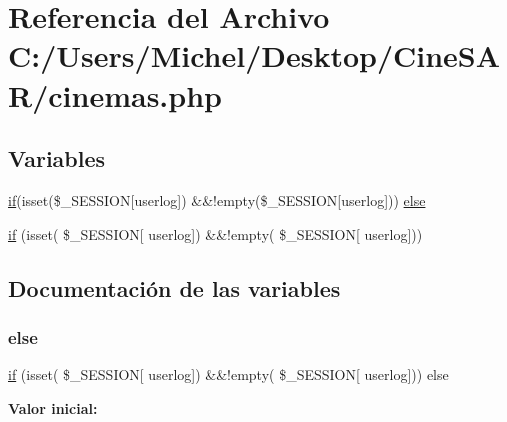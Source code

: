 \hypertarget{cinemas_8php}{}\section{Referencia del Archivo C\+:/\+Users/\+Michel/\+Desktop/\+Cine\+S\+A\+R/cinemas.php}
\label{cinemas_8php}
\subsection*{Variables}
\begin{DoxyCompactItemize}
\item 
\mbox{\hyperlink{register_8php_aefb5893336d7ead40ae915367f4b82cc}{if}}(isset(\$\+\_\+\+S\+E\+S\+S\+I\+ON\mbox{[}\textquotesingle{}userlog\textquotesingle{}\mbox{]}) \&\&!empty(\$\+\_\+\+S\+E\+S\+S\+I\+ON\mbox{[}\textquotesingle{}userlog\textquotesingle{}\mbox{]})) \mbox{\hyperlink{cinemas_8php_a3e85a20b0f9c4bed1d7e6bf901f6030c}{else}}
\item 
\mbox{\hyperlink{cinemas_8php_aefb5893336d7ead40ae915367f4b82cc}{if}} (isset( \$\+\_\+\+S\+E\+S\+S\+I\+ON\mbox{[} \textquotesingle{}userlog\textquotesingle{}\mbox{]}) \&\&!empty( \$\+\_\+\+S\+E\+S\+S\+I\+ON\mbox{[} \textquotesingle{}userlog\textquotesingle{}\mbox{]}))
\end{DoxyCompactItemize}


\subsection{Documentación de las variables}
\mbox{\label{cinemas_8php_a3e85a20b0f9c4bed1d7e6bf901f6030c}} 
\subsubsection{\texorpdfstring{else}{else}}
{\footnotesize\ttfamily \mbox{\hyperlink{register_8php_aefb5893336d7ead40ae915367f4b82cc}{if}} (isset( \$\+\_\+\+S\+E\+S\+S\+I\+ON\mbox{[} \textquotesingle{}userlog\textquotesingle{}\mbox{]}) \&\&!empty( \$\+\_\+\+S\+E\+S\+S\+I\+ON\mbox{[} \textquotesingle{}userlog\textquotesingle{}\mbox{]})) else}

{\bfseries Valor inicial\+:}
\begin{DoxyCode}{0}
\DoxyCodeLine{\{}

\end{DoxyCode}


